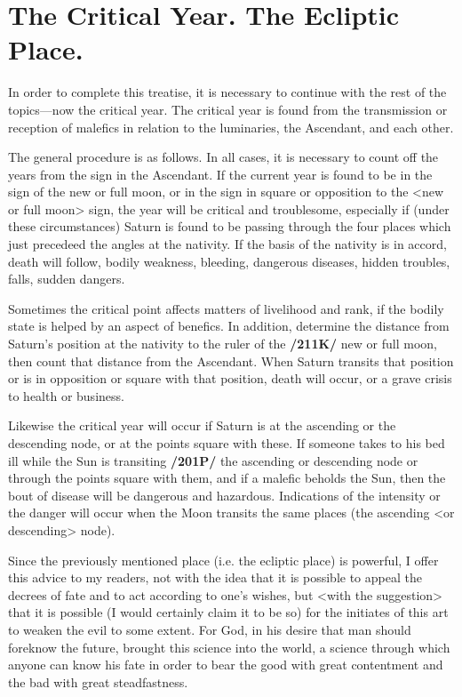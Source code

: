 \section{The Critical Year. The Ecliptic Place.}

In order to complete this treatise, it is necessary to continue with the rest of the topics—now the critical year. The critical year is found from the transmission or reception of malefics in relation to the luminaries, the Ascendant, and each other. 

The general procedure is as follows. In all cases, it is necessary
to count off the years from the sign in the Ascendant. If the current year is found to be in the sign of the new or full moon, or in the sign in square or opposition to the <new or full moon> sign, the year will be critical and troublesome, especially if (under these circumstances) Saturn is found to be passing through the four places which just precedeed the angles at the nativity. If the basis of the nativity is in accord, death will follow, bodily weakness, bleeding, dangerous diseases, hidden troubles, falls, sudden dangers.

Sometimes the critical point affects matters of livelihood and rank, if the bodily state is helped by an aspect of benefics. In addition, determine the distance from Saturn’s position at the nativity to the ruler of the \textbf{/211K/} new or full moon, then count that distance from the Ascendant. When Saturn transits that position or is in opposition or square with that position, death will occur, or a grave crisis to health or business. 

Likewise the critical year will occur if Saturn is at the ascending or the descending node, or at the points square with these. If someone takes to his bed ill while the Sun is transiting \textbf{/201P/} the ascending or descending node or through the points square with them, and if a malefic beholds the Sun, then the bout of disease will be dangerous and hazardous. Indications of the intensity or the danger will occur when the Moon transits the same places (the ascending <or descending> node).

\mndl Since the previously mentioned place (i.e. the ecliptic place) is powerful, I offer this advice to my readers, not with the idea that it is possible to appeal the decrees of fate and to act according to one’s wishes, but <with the suggestion> that it is possible (I would certainly claim it to be so) for the initiates of this art to weaken the evil to some extent. For God, in his desire that man should foreknow the future, brought this science into the world, a science through which anyone can know his fate in order to bear the good with great contentment and the bad with great steadfastness. 

